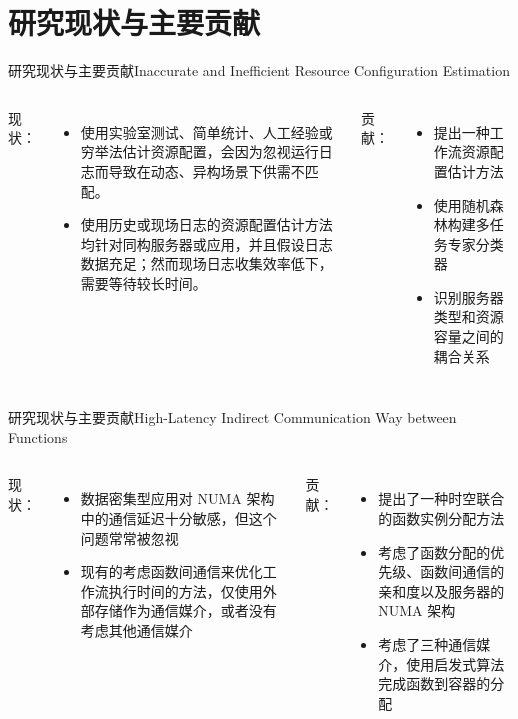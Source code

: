 \documentclass[aspectratio=169]{beamer}
\begin{document}
\section{研究现状与主要贡献}

\begin{frame}{研究现状与主要贡献}{Inaccurate and Inefficient Resource Configuration Estimation}
  \begin{columns}
    现状：
    \begin{itemize}
      \item 使用实验室测试、简单统计、人工经验或穷举法估计资源配置，会因为忽视运行日志而导致在动态、异构场景下供需不匹配。
      \item 使用历史或现场日志的资源配置估计方法均针对同构服务器或应用，并且假设日志数据充足；然而现场日志收集效率低下，需要等待较长时间。
    \end{itemize}

    贡献：
    \begin{itemize}
      \item 提出一种工作流资源配置估计方法
      \item 使用随机森林构建多任务专家分类器
      \item 识别服务器类型和资源容量之间的耦合关系
    \end{itemize}
  \end{columns}
\end{frame}

\begin{frame}{研究现状与主要贡献}{High-Latency Indirect Communication Way between Functions}
  \begin{columns}
    现状：
    \begin{itemize}
      \item 数据密集型应用对 NUMA 架构中的通信延迟十分敏感，但这个问题常常被忽视
      \item 现有的考虑函数间通信来优化工作流执行时间的方法，仅使用外部存储作为通信媒介，或者没有考虑其他通信媒介
    \end{itemize}

    贡献：
    \begin{itemize}
      \item 提出了一种时空联合的函数实例分配方法
      \item 考虑了函数分配的优先级、函数间通信的亲和度以及服务器的 NUMA 架构
      \item 考虑了三种通信媒介，使用启发式算法完成函数到容器的分配
    \end{itemize}
  \end{columns}
\end{frame}
\end{document}
